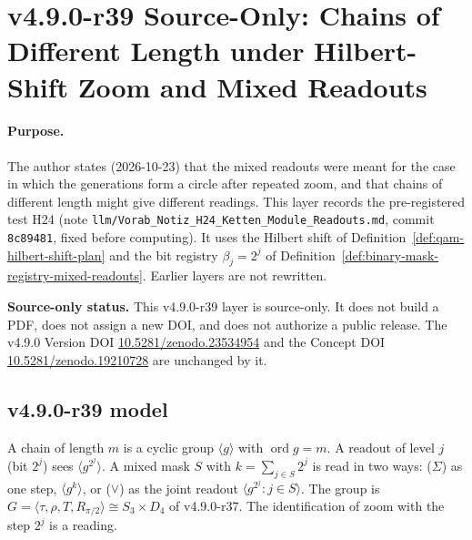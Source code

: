 \clearpage
\section*{v4.9.0-r39 Source-Only: Chains of Different Length under Hilbert-Shift Zoom and Mixed Readouts}
\label{sec:v490-r39-chains-zoom-mixed}

\paragraph{Purpose.}
The author states (2026-10-23) that the mixed readouts were meant for the case in which the generations form a circle after
repeated zoom, and that chains of different length might give different readings.  This layer records the pre-registered test H24
(note \texttt{llm/Vorab\_Notiz\_H24\_Ketten\_Module\_Readouts.md}, commit \texttt{8c89481}, fixed before computing).  It uses the
Hilbert shift of Definition~\ref{def:qam-hilbert-shift-plan} and the bit registry \(\beta_j=2^j\) of
Definition~\ref{def:binary-mask-registry-mixed-readouts}.  Earlier layers are not rewritten.

\noindent\textbf{Source-only status.}
This v4.9.0-r39 layer is source-only.  It does not build a PDF, does not assign a new DOI,
and does not authorize a public release.  The v4.9.0 Version DOI
\href{https://doi.org/10.5281/zenodo.23534954}{10.5281/zenodo.23534954} and the Concept DOI
\href{https://doi.org/10.5281/zenodo.19210728}{10.5281/zenodo.19210728} are unchanged by it.

\subsection*{v4.9.0-r39 model}
\label{subsec:v490-r39-model}

A chain of length \(m\) is a cyclic group \(\langle g\rangle\) with \(\operatorname{ord}g=m\).  A readout of level \(j\) (bit \(2^j\)) sees
\(\langle g^{2^j}\rangle\).  A mixed mask \(S\) with \(k=\sum_{j\in S}2^j\) is read in two ways: (\(\Sigma\)) as one step,
\(\langle g^k\rangle\), or (\(\vee\)) as the joint readout \(\langle g^{2^j}:j\in S\rangle\).  The group is
\(G=\langle\tau,\rho,T,R_{\pi/2}\rangle\cong S_3\times D_4\) of v4.9.0-r37.  The identification of zoom with the step \(2^j\) is a reading.

